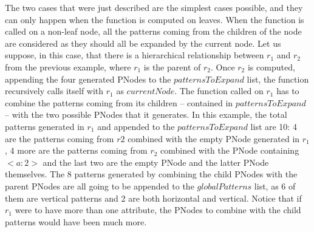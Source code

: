 \documentclass{acm_proc_article-sp-sigmod09}
\begin{document}
The two cases that were just described are the simplest cases possible, and they can only happen when the function is computed on leaves. When the function is called on a non-leaf node, all the patterns coming from the children of the node are considered as they should all be expanded by the current node. Let us suppose, in this case, that there is a hierarchical relationship between $r_1$ and $r_2$ from the previous example, where $r_1$ is the parent of $r_2$. Once $r_2$ is computed, appending the four generated PNodes to the $patternsToExpand$ list, the function recursively calls itself with $r_1$ as $currentNode$. The function called on $r_1$ has to combine the patterns coming from its children -- contained in $patternsToExpand$ -- with the two possible PNodes that it generates. In this example, the total patterns generated in $r_1$ and appended to the $patternsToExpand$ list are 10: 4 are the patterns coming from $r2$ combined with the empty PNode generated in $r_1$, 4 more are the patterns coming from $r_2$ combined with the PNode containing $<a \colon 2>$ and the last two are the empty PNode and the latter PNode themselves. The 8 patterns generated by combining the child PNodes with the parent PNodes are all going to be appended to the $globalPatterns$ list, as 6 of them are vertical patterns and 2 are both horizontal and vertical. Notice that if $r_1$ were to have more than one attribute, the PNodes to combine with the child patterns would have been much more.
\end{document}
